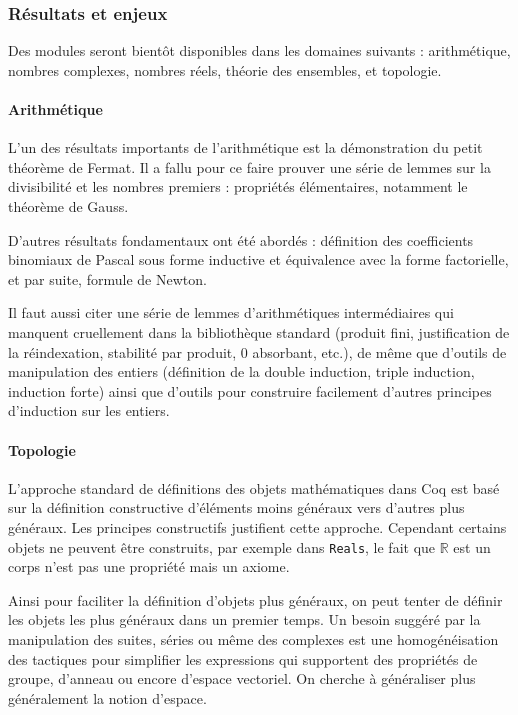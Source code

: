 \documentclass[a4paper,10pt]{article}
\newcommand{\coqcode}[1]{\texttt{#1}}
\begin{document}

\subsubsection{Résultats et enjeux}

Des modules seront bientôt disponibles dans les domaines suivants : arith\-métique, nombres complexes, nombres réels, théorie des ensembles, et topologie.

\paragraph{Arithmétique}

L'un des résultats importants de l'arithmétique est la démon\-stration du petit théorème de Fermat. Il a fallu pour ce faire prouver une série de lemmes sur la divisibilité et les nombres premiers : propriétés élémentaires, notamment le théorème de Gauss.

D'autres résultats fondamentaux ont été abordés : définition des coefficients binomiaux de Pascal sous forme inductive et équivalence avec la forme factorielle, et par suite, formule de Newton.

Il faut aussi citer une série de lemmes d'arithmétiques intermédiaires qui manquent cruellement dans la bibliothèque standard (produit fini, justification de la réindexation, stabilité par produit, $0$ absorbant, etc.), de même que d'outils de manipulation des entiers (définition de la double induction, triple induction, induction forte) ainsi que d'outils pour construire facilement d'autres principes d'induction sur les entiers.

\paragraph{Topologie}

L'approche standard de définitions des objets mathématiques dans Coq est basé sur la définition constructive d'éléments moins généraux vers d'autres plus généraux. Les principes constructifs justifient cette approche. Cependant certains objets ne peuvent être construits, par exemple dans \coqcode{Reals}, le fait que $\mathbb{R}$ est un corps n'est pas une propriété mais un axiome.

Ainsi pour faciliter la définition d'objets plus généraux, on peut tenter de définir les objets les plus généraux dans un premier temps. Un besoin suggéré par la manipulation des suites, séries ou même des complexes est une homogénéisation des tactiques pour simplifier les expressions qui supportent des propriétés de groupe, d'anneau ou encore d'espace vectoriel. On cherche à géné\-raliser plus généralement la notion d'espace.
\end{document}

